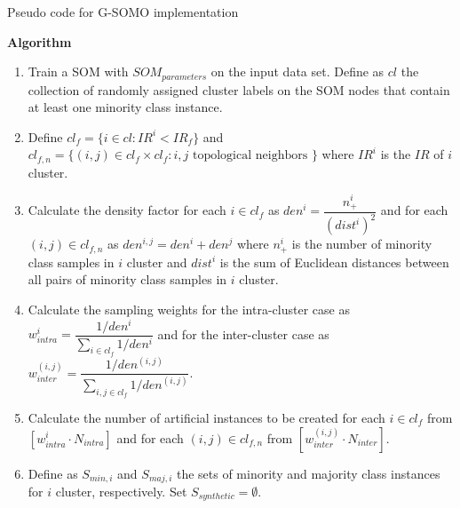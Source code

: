 \documentclass[parskip=full]{scrartcl}
\begin{document}
\begin{algorithm}[H]

	\SetAlgoLined
	\caption{Pseudo code for G-SOMO implementation}

	\BlankLine



	\BlankLine

	\textbf{Algorithm}
	\SetAlgoLined

	\begin{enumerate}

		\item Train a SOM with $SOM_{parameters}$ on the input data set. Define
		      as $cl$ the collection of randomly assigned cluster labels on the
		      SOM nodes that contain at least one minority class instance.

		\item Define $cl_{f} =\{i \in cl: IR^{i} < IR_{f} \} $ and
		      $cl_{f, n} =\{(i, j) \in cl_{f} \times cl_{f}: i, j \text{ topological neighbors } \} $
		      where $IR^{i}$ is the $IR$ of  $i$ cluster.

		\item Calculate the density factor for each $i \in cl_{f}$  as $den^{i}
			      = \dfrac{n^{i}_{+}}{(dist^{i})^2}$ and for each $(i, j) \in cl_{f, n}$
		      as $den^{i, j} = den^{i} + den^{j}$ where $n^{i}_{+}$ is the
		      number of minority class samples in $i$ cluster and $dist^{i}$ is
		      the sum of Euclidean distances between all pairs  of minority
		      class samples in $i$ cluster.

		\item Calculate the sampling weights for the intra-cluster case as
		      $w^{i}_{intra} = \dfrac{1 / den^{i}}{\sum_{i \in cl_{f}} 1/den^{i}}$ and
		      for the inter-cluster case as
		      $w^{(i, j)}_{inter} = \dfrac{1 / den^{(i, j)}}{\sum_{i,j \in cl_{f}} 1/den^{(i,j)}}$.

		\item Calculate the number of artificial instances to be created for
		      each $i \in cl_{f}$ from $[w^{i}_{intra} \cdot N_{intra}]$ and for
		      each $(i, j) \in cl_{f, n}$ from $[w^{(i, j)}_{inter} \cdot N_{inter}]$.

		\item Define as $S_{min, i}$ and $S_{maj, i}$ the sets of minority and
		      majority class instances for $i$ cluster, respectively.
		      Set $S_{synthetic} = \emptyset$.


\end{enumerate}
\end{algorithm}
\end{document}
